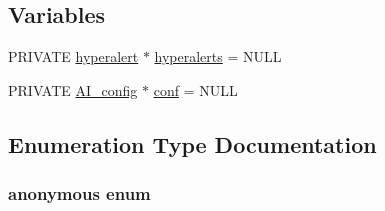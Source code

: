 \subsection*{Variables}
\begin{DoxyCompactItemize}
\item 
PRIVATE \hyperlink{structhyperalert}{hyperalert} $\ast$ \hyperlink{group__correlation_ga343192ed5e938536f3dc150e51f8acf6}{hyperalerts} = NULL
\item 
PRIVATE \hyperlink{structAI__config}{AI\_\-config} $\ast$ \hyperlink{group__correlation_gaad7a982b6016390e7cd1164bd7db8bca}{conf} = NULL
\end{DoxyCompactItemize}


\subsection{Enumeration Type Documentation}
\hypertarget{group__correlation_ga06fc87d81c62e9abb8790b6e5713c55b}{
\subsubsection[{"@0}]{\setlength{\rightskip}{0pt plus 5cm}anonymous enum}}
\label{group__correlation_ga06fc87d81c62e9abb8790b6e5713c55b}
